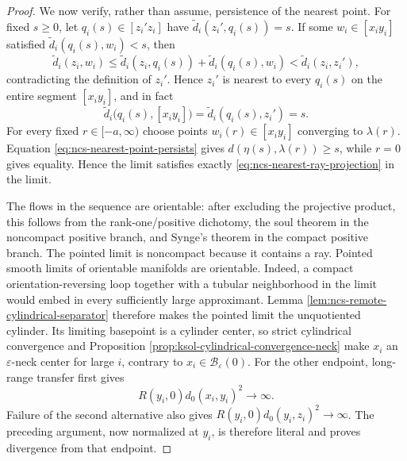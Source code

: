 \documentclass[10pt]{coll-l}
\theoremstyle{definition}
\theoremstyle{remark}
\numberwithin{section}{chapter}
\numberwithin{equation}{chapter}
\begin{document}
\begin{proof}
We now verify, rather than assume, persistence of the nearest point.  For
fixed $s\geq0$, let $q_i(s)\in[z_i'z_i]$ have
$\widetilde d_i(z_i',q_i(s))=s$.  If some
$w_i\in[x_iy_i]$ satisfied
$\widetilde d_i(q_i(s),w_i)<s$, then
\begin{equation}
 \widetilde d_i(z_i,w_i)
 \leq \widetilde d_i(z_i,q_i(s))+
      \widetilde d_i(q_i(s),w_i)
 <\widetilde d_i(z_i,z_i'),                           \label{eq:ncs-nearest-point-subsegment-contradiction}
\end{equation}
contradicting the definition of $z_i'$.  Hence $z_i'$ is nearest to every
$q_i(s)$ on the entire segment $[x_iy_i]$, and in fact
\begin{equation}
 \widetilde d_i\bigl(q_i(s),[x_iy_i]\bigr)
      =\widetilde d_i(q_i(s),z_i')=s.                 \label{eq:ncs-nearest-point-persists}
\end{equation}
For every fixed $r\in[-a,\infty)$ choose points
$w_i(r)\in[x_iy_i]$ converging to $\lambda(r)$.  Equation
\eqref{eq:ncs-nearest-point-persists} gives
$d(\eta(s),\lambda(r))\geq s$, while $r=0$ gives equality.  Hence the
limit satisfies exactly
\eqref{eq:ncs-nearest-ray-projection} in the limit.

The flows in the sequence are orientable: after excluding the projective
product, this follows from the rank-one/positive dichotomy, the soul
theorem in the noncompact positive branch, and Synge's theorem in the
compact positive branch.  The pointed limit is noncompact because it
contains a ray.  Pointed smooth limits of
orientable manifolds are orientable.  Indeed, a compact
orientation-reversing loop together with a tubular neighborhood in the
limit would embed in every sufficiently large approximant.  Lemma
\ref{lem:ncs-remote-cylindrical-separator} therefore makes the pointed
limit the unquotiented cylinder.  Its limiting basepoint is a
cylinder center, so strict cylindrical convergence and Proposition
\ref{prop:ksol-cylindrical-convergence-neck} make $x_i$ an
$\varepsilon$-neck center for large $i$, contrary to
$x_i\in\mathscr B_\varepsilon(0)$.  For the other endpoint, long-range
transfer first gives
\begin{equation}
                   R(y_i,0)d_0(x_i,y_i)^2\longrightarrow\infty.  \label{eq:ncs-y-endpoint-remote-scale}
\end{equation}
Failure of the second alternative also gives
$R(y_i,0)d_0(y_i,z_i)^2\to\infty$.  The preceding argument, now normalized
at $y_i$, is therefore literal and proves divergence from that endpoint.


\end{proof}
\end{document}
